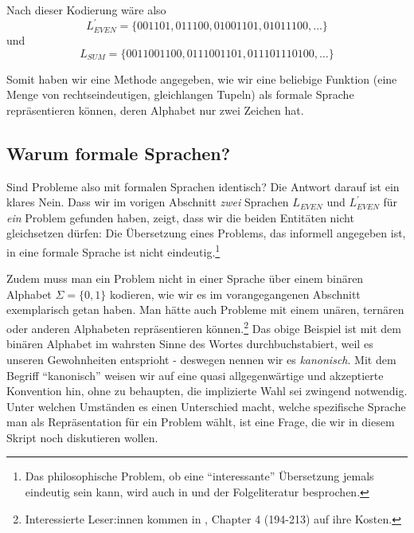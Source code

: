 Nach dieser Kodierung wäre also 
\[
    L_{EVEN}^{'} = \{001101, 011100, 01001101, 01011100, \ldots \}
\]
und
\[
    L_{SUM} = \{0011001100, 0111001101, 011101110100, \ldots \}
\]

Somit haben wir eine Methode angegeben,
wie wir eine beliebige Funktion
(eine Menge von rechtseindeutigen, gleichlangen Tupeln)
als formale Sprache repräsentieren können,
deren Alphabet nur zwei Zeichen hat.


\subsection{Warum formale Sprachen?}\label{subsec:warumFormaleSprachen}

Sind Probleme also mit formalen Sprachen identisch?
Die Antwort darauf ist ein klares Nein.
Dass wir im vorigen Abschnitt \emph{zwei} Sprachen
$L_{EVEN}$ und $L_{EVEN}^{'}$ für \emph{ein} Problem gefunden haben,
zeigt, dass wir die beiden Entitäten nicht gleichsetzen dürfen:
Die Übersetzung eines Problems, das informell angegeben ist,
in eine formale Sprache ist nicht eindeutig.\footnote{
Das philosophische Problem, ob eine ``interessante'' Übersetzung jemals eindeutig sein kann,
wird auch in \cite{quine} und der Folgeliteratur besprochen.}

Zudem muss man ein Problem nicht in einer Sprache über einem binären Alphabet
$\Sigma = \{0,1\}$ kodieren,
wie wir es im vorangegangenen Abschnitt exemplarisch getan haben.
Man hätte auch Probleme mit einem unären, ternären 
oder anderen Alphabeten repräsentieren können.\footnote{
    Interessierte Leser:innen kommen in \cite{knuth2}, Chapter 4 (194-213) auf ihre Kosten.
}
Das obige Beispiel ist mit dem binären Alphabet im wahrsten Sinne des Wortes durchbuchstabiert,
weil es unseren Gewohnheiten entsprioht
- deswegen nennen wir es \emph{kanonisch}.
Mit dem Begriff ``kanonisch'' weisen wir
auf eine quasi allgegenwärtige und akzeptierte Konvention hin,
ohne zu behaupten, die implizierte Wahl sei zwingend notwendig.
Unter welchen Umständen es einen Unterschied macht,
welche spezifische Sprache man als Repräsentation für ein Problem wählt,
ist eine Frage,
die wir in diesem Skript noch diskutieren wollen.


